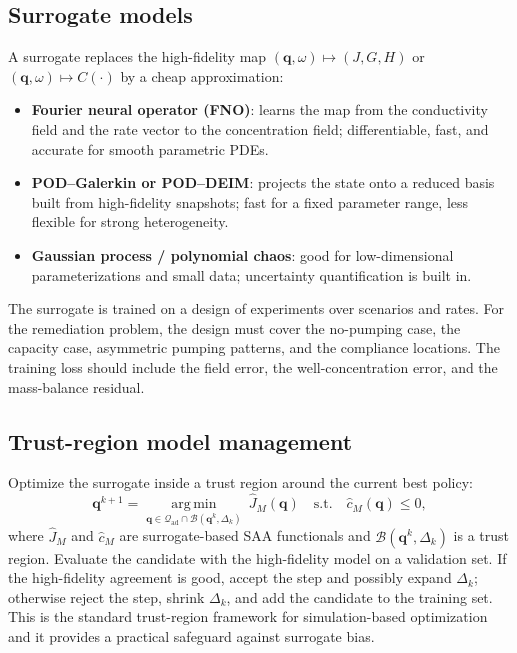 \documentclass[11pt]{article}
\numberwithin{equation}{section}
\newcommand{\qq}{\mathbf{q}}
\newcommand{\argmin}{\operatorname*{arg\,min}}
\theoremstyle{plain}
\begin{document}
\subsection{Surrogate models}

A surrogate replaces the high-fidelity map
$(\qq,\omega)\mapsto(J,G,H)$ or $(\qq,\omega)\mapsto C(\cdot)$ by a cheap
approximation:
\begin{itemize}[leftmargin=1.6em,itemsep=2pt]
  \item \textbf{Fourier neural operator (FNO)}: learns the map from the
        conductivity field and the rate vector to the concentration field;
        differentiable, fast, and accurate for smooth parametric PDEs.
  \item \textbf{POD--Galerkin or POD--DEIM}: projects the state onto a
        reduced basis built from high-fidelity snapshots; fast for a fixed
        parameter range, less flexible for strong heterogeneity.
  \item \textbf{Gaussian process / polynomial chaos}: good for low-dimensional
        parameterizations and small data; uncertainty quantification is built
        in.
\end{itemize}
The surrogate is trained on a design of experiments over scenarios and rates.
For the remediation problem, the design must cover the no-pumping case, the
capacity case, asymmetric pumping patterns, and the compliance locations.
The training loss should include the field error, the well-concentration
error, and the mass-balance residual.

\subsection{Trust-region model management}

Optimize the surrogate inside a trust region around the current best policy:
\begin{equation}
\label{eq:tr}
\qq^{k+1}
=\argmin_{\qq\in\mathcal{Q}_{\mathrm{ad}}\cap\mathcal{B}(\qq^k,\Delta_k)}
\ \hat J_M(\qq)
\quad\text{s.t.}\quad
\hat c_M(\qq)\le0,
\end{equation}
where $\hat J_M$ and $\hat c_M$ are surrogate-based SAA functionals and
$\mathcal{B}(\qq^k,\Delta_k)$ is a trust region.  Evaluate the candidate with
the high-fidelity model on a validation set.  If the high-fidelity agreement
is good, accept the step and possibly expand $\Delta_k$; otherwise reject the
step, shrink $\Delta_k$, and add the candidate to the training set.  This is
the standard trust-region framework for simulation-based optimization and it
provides a practical safeguard against surrogate bias.
\end{document}
